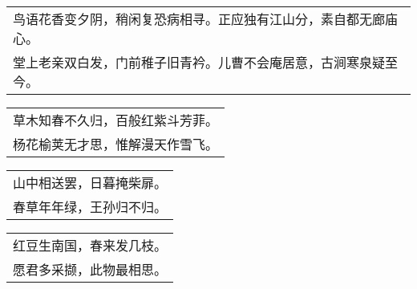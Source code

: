 \nopagebreak%
\nopagebreak%
\noindent\begin{minipage}{\linewidth}
  \vskip-3pt\begin{table}[H]
    \centering
    \begin{tabular}{@{}l@{}}
鸟语花香变夕阴，稍闲复恐病相寻。正应独有江山分，素自都无廊庙心。\\
堂上老亲双白发，门前稚子旧青衿。儿曹不会庵居意，古涧寒泉疑至今。
    \end{tabular}
  \end{table}
\end{minipage}
\vspace{1cm}


\nopagebreak%
\nopagebreak%
\noindent\begin{minipage}{\linewidth}
  \vskip-3pt\begin{table}[H]
    \centering
    \begin{tabular}{@{}l@{}}
草木知春不久归，百般红紫斗芳菲。\\
杨花榆荚无才思，惟解漫天作雪飞。
    \end{tabular}
  \end{table}
\end{minipage}
\vspace{1cm}


\nopagebreak%
\nopagebreak%
\noindent\begin{minipage}{\linewidth}
  \vskip-3pt\begin{table}[H]
    \centering
    \begin{tabular}{@{}l@{}}
山中相送罢，日暮掩柴扉。\\
春草年年绿，王孙归不归。
    \end{tabular}
  \end{table}
\end{minipage}
\vspace{1cm}


\nopagebreak%
\nopagebreak%
\noindent\begin{minipage}{\linewidth}
  \vskip-3pt\begin{table}[H]
    \centering
    \begin{tabular}{@{}l@{}}
红豆生南国，春来发几枝。\\
愿君多采撷，此物最相思。
    \end{tabular}
  \end{table}
\end{minipage}
\vspace{1cm}



